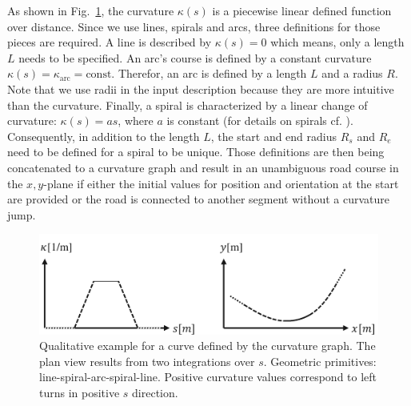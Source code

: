 \documentclass[a4paper, 10pt, conference]{ieeeconf}      %
\begin{document}
As shown in Fig.~\ref{fig_curvGraph}, the curvature $\kappa(s)$ is a piecewise linear defined function over distance. Since we use lines, spirals and arcs, three definitions for those pieces are required. A line is described by $\kappa(s) = 0$ which means, only a length $L$ needs to be specified. An arc's course is defined by a constant curvature $\kappa(s) = \kappa_\text{arc} = \text{const}$. Therefor, an arc is defined by a length $L$ and a radius $R$. Note that we use radii in the input description because they are more intuitive than the curvature. Finally, a spiral is characterized by a linear change of curvature: $\kappa(s) = a s$, where $a$ is constant (for details on spirals cf. \cite{Baier.2008}). Consequently, in addition to the length $L$, the start and end radius $R_s$ and $R_e$ need to be defined for a spiral to be unique. Those definitions are then being concatenated to a curvature graph and result in an unambiguous road course in the $x,y$-plane if either the initial values for position and orientation at the start are provided or the road is connected to another segment without a curvature jump.

\begin{figure}%
	\centering
	\includegraphics{fig/curvGraph.pdf}
	\caption{Qualitative example for a curve defined by the curvature graph. The plan view results from two integrations over $s$. Geometric primitives: line-spiral-arc-spiral-line. Positive curvature values correspond to left turns in positive $s$ direction.}
	\label{fig_curvGraph}
\end{figure}
\end{document}
